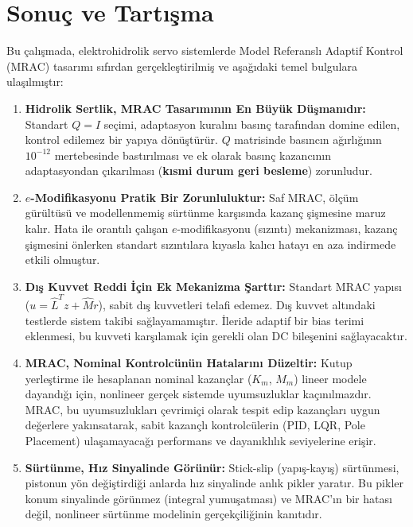 \documentclass[12pt,a4paper]{article}
\begin{document}
\section{Sonuç ve Tartışma}
\label{sec:conclusion}

Bu çalışmada, elektrohidrolik servo sistemlerde Model Referanslı Adaptif Kontrol (MRAC) tasarımı sıfırdan gerçekleştirilmiş ve aşağıdaki temel bulgulara ulaşılmıştır:

\begin{enumerate}
    \item \textbf{Hidrolik Sertlik, MRAC Tasarımının En Büyük Düşmanıdır:} Standart $Q = I$ seçimi, adaptasyon kuralını basınç tarafından domine edilen, kontrol edilemez bir yapıya dönüştürür. $Q$ matrisinde basıncın ağırlığının $10^{-12}$ mertebesinde bastırılması ve ek olarak basınç kazancının adaptasyondan çıkarılması (\textbf{kısmi durum geri besleme}) zorunludur.

    \item \textbf{$e$-Modifikasyonu Pratik Bir Zorunluluktur:} Saf MRAC, ölçüm gürültüsü ve modellenmemiş sürtünme karşısında kazanç şişmesine maruz kalır. Hata ile orantılı çalışan $e$-modifikasyonu (sızıntı) mekanizması, kazanç şişmesini önlerken standart sızıntılara kıyasla kalıcı hatayı en aza indirmede etkili olmuştur.

    \item \textbf{Dış Kuvvet Reddi İçin Ek Mekanizma Şarttır:} Standart MRAC yapısı ($u = \hat{L}^T z + \hat{M} r$), sabit dış kuvvetleri telafi edemez. Dış kuvvet altındaki testlerde sistem takibi sağlayamamıştır. İleride adaptif bir bias terimi eklenmesi, bu kuvveti karşılamak için gerekli olan DC bileşenini sağlayacaktır.

    \item \textbf{MRAC, Nominal Kontrolcünün Hatalarını Düzeltir:} Kutup yerleştirme ile hesaplanan nominal kazançlar ($K_m$, $M_m$) lineer modele dayandığı için, nonlineer gerçek sistemde uyumsuzluklar kaçınılmazdır. MRAC, bu uyumsuzlukları çevrimiçi olarak tespit edip kazançları uygun değerlere yakınsatarak, sabit kazançlı kontrolcülerin (PID, LQR, Pole Placement) ulaşamayacağı performans ve dayanıklılık seviyelerine erişir.

    \item \textbf{Sürtünme, Hız Sinyalinde Görünür:} Stick-slip (yapış-kayış) sürtünmesi, pistonun yön değiştirdiği anlarda hız sinyalinde anlık pikler yaratır. Bu pikler konum sinyalinde görünmez (integral yumuşatması) ve MRAC'ın bir hatası değil, nonlineer sürtünme modelinin gerçekçiliğinin kanıtıdır.
\end{enumerate}
\end{document}
